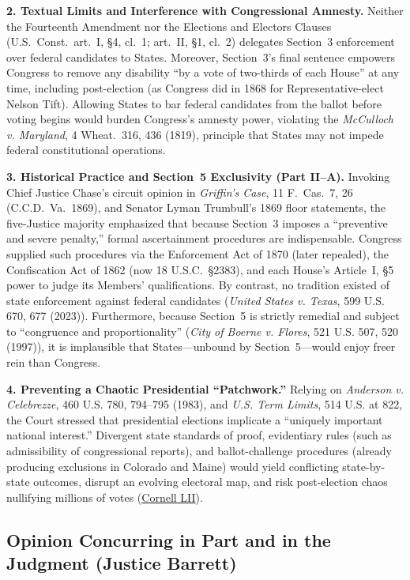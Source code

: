\documentclass[12pt]{article}
\begin{document}
\textbf{2. Textual Limits and Interference with Congressional Amnesty.} Neither the Fourteenth Amendment nor the Elections and Electors Clauses (U.S.\ Const.\ art.\ I, \S 4, cl.\ 1; art.\ II, \S 1, cl.\ 2) delegates Section~3 enforcement over federal candidates to States. Moreover, Section~3's final sentence empowers Congress to remove any disability ``by a vote of two-thirds of each House'' at any time, including post-election (as Congress did in 1868 for Representative-elect Nelson Tift). Allowing States to bar federal candidates from the ballot before voting begins would burden Congress's amnesty power, violating the \emph{McCulloch v. Maryland}, 4 Wheat.\ 316, 436 (1819), principle that States may not impede federal constitutional operations.

\textbf{3. Historical Practice and Section~5 Exclusivity (Part II--A).} Invoking Chief Justice Chase's circuit opinion in \emph{Griffin's Case}, 11 F.\ Cas.\ 7, 26 (C.C.D.\ Va.\ 1869), and Senator Lyman Trumbull's 1869 floor statements, the five-Justice majority emphasized that because Section~3 imposes a ``preventive and severe penalty,'' formal ascertainment procedures are indispensable. Congress supplied such procedures via the Enforcement Act of 1870 (later repealed), the Confiscation Act of 1862 (now 18 U.S.C.\ \S 2383), and each House's Article~I, \S 5 power to judge its Members' qualifications. By contrast, no tradition existed of state enforcement against federal candidates (\emph{United States v. Texas}, 599 U.S. 670, 677 (2023)). Furthermore, because Section~5 is strictly remedial and subject to ``congruence and proportionality'' (\emph{City of Boerne v. Flores}, 521 U.S. 507, 520 (1997)), it is implausible that States---unbound by Section~5---would enjoy freer rein than Congress.

\textbf{4. Preventing a Chaotic Presidential ``Patchwork.''} Relying on \emph{Anderson v. Celebrezze}, 460 U.S. 780, 794--795 (1983), and \emph{U.S. Term Limits}, 514 U.S. at 822, the Court stressed that presidential elections implicate a ``uniquely important national interest.'' Divergent state standards of proof, evidentiary rules (such as admissibility of congressional reports), and ballot-challenge procedures (already producing exclusions in Colorado and Maine) would yield conflicting state-by-state outcomes, disrupt an evolving electoral map, and risk post-election chaos nullifying millions of votes (\href{https://www.law.cornell.edu/supremecourt/text/23-719}{Cornell LII}).

\subsection{Opinion Concurring in Part and in the Judgment (Justice Barrett)}
\end{document}
